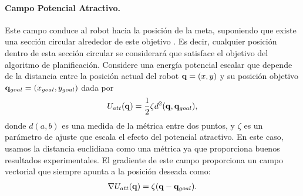 \paragraph{Campo Potencial Atractivo.}
Este campo conduce al robot hacia la posición de la meta, suponiendo que existe una 
sección circular  alrededor de este objetivo \cite{koren1991potential}. Es decir, 
cualquier posición dentro de esta sección circular se considerará que satisface el 
objetivo del algoritmo de planificación. Considere una energía potencial escalar 
que depende de la distancia entre la posición actual del robot $\mathbf q=(x,y)$ y su 
posición objetivo $\mathbf q_{goal} = (x_{goal}, y_{goal})$ dada por
\begin{align}
\label{eqn:pot_attr}
U_{att}(\mathbf q) = \frac{1}{2}\zeta d^{2} (\mathbf q,\mathbf q_{goal}),
\end{align}
donde $d(a,b)$ es una medida de la métrica entre dos puntos, y $\zeta$ es un 
parámetro de ajuste que escala el efecto del potencial atractivo. En este 
caso, usamos la distancia euclidiana como una métrica ya que proporciona 
buenos resultados experimentales. El gradiente de este campo proporciona un 
campo vectorial que siempre apunta a la posición deseada como:
\begin{align}
\label{eqn:gradient_att}
\nabla U_{att}(\mathbf q)=\zeta(\mathbf q-\mathbf q_{goal}).
\end{align}

